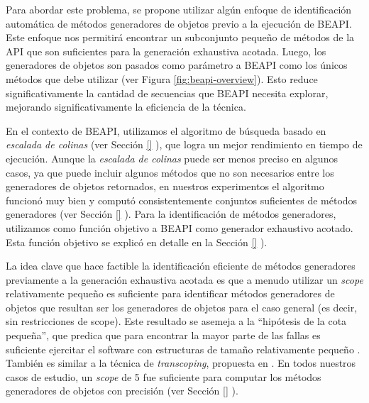 Para abordar este problema, se propone utilizar algún enfoque de identificación
automática de métodos generadores de objetos previo a la ejecución de BEAPI. 
Este enfoque nos permitirá encontrar un subconjunto pequeño de métodos de la API que son
suficientes para la generación exhaustiva acotada.
Luego, los generadores de objetos son pasados como parámetro a BEAPI como los
únicos métodos que debe utilizar (ver Figura \ref{fig:beapi-overview}). 
Esto reduce significativamente la cantidad de
secuencias que BEAPI necesita explorar, mejorando significativamente la
eficiencia de la técnica.

En el contexto de \textsf{BEAPI}, utilizamos el algoritmo de búsqueda basado en
\emph{escalada de colinas} (ver Sección \ref{} ), que logra un mejor rendimiento en tiempo de
ejecución. 
Aunque la \emph{escalada de colinas} puede ser menos preciso en algunos casos,
ya que puede incluir algunos métodos que no son necesarios entre los generadores
de objetos retornados, en nuestros experimentos el algoritmo funcionó muy bien y
computó consistentemente conjuntos suficientes de métodos generadores (ver
Sección \ref{} ). 
Para la identificación de métodos generadores, utilizamos como función objetivo
a BEAPI como generador exhaustivo acotado. Esta función objetivo se explicó en
detalle en la Sección \ref{} ). 

La idea clave que hace factible la identificación eficiente de métodos generadores
previamente a la generación exhaustiva acotada es que a menudo utilizar un
\emph{scope} relativamente pequeño es suficiente para identificar métodos
generadores de objetos que resultan ser los generadores de objetos para el caso
general (es decir, sin restricciones de scope).
Este resultado se asemeja a la ``hipótesis de la cota pequeña'', que predica que
para encontrar la mayor parte de las fallas es suficiente ejercitar el software
con estructuras de tamaño relativamente pequeño \cite{Andoni02}. También es
similar a la técnica de \emph{transcoping}, propuesta en \cite{Rosner13}.
En todos nuestros casos de estudio, un \emph{scope} de 5 fue suficiente para
computar los métodos generadores de objetos con precisión (ver Sección
\ref{} ). 

